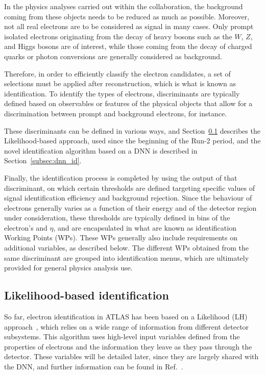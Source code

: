 In the physics analyses carried out within the collaboration, the background coming from these objects needs to be reduced as much as possible. Moreover, not all real electrons are to be considered as signal in many cases. Only prompt isolated electrons originating from the decay of heavy bosons such as the $W$, $Z$, and Higgs bosons are of interest, while those coming from the decay of charged quarks or photon conversions are generally considered as background.

Therefore, in order to efficiently classify the electron candidates, a set of selections must be applied after reconstruction, which is what is known as identification. To identify the types of electrons, discriminants are typically defined based on observables or features of the physical objects that allow for a discrimination between prompt and background electrons, for instance.

These discriminants can be defined in various ways, and Section~\ref{LH_identification} describes the Likelihood-based approach, used since the beginning of the Run-2 period, and the novel identification algorithm based on a DNN is described in Section~\ref{subsec:dnn_id}.

Finally, the identification process is completed by using the output of that discriminant, on which certain thresholds are defined targeting specific values of signal identification efficiency and background rejection. Since the behaviour of electrons generally varies as a function of their energy and of the detector region under consideration, these thresholds are typically defined in bins of the electron’s \et and $\eta$, and are encapsulated in what are known as identification Working Points (WPs). These WPs generally also include requirements on additional variables, as described below. The different WPs obtained from the same discriminant are grouped into identification menus, which are ultimately provided for general physics analysis use.

\subsection{Likelihood-based identification}
\label{LH_identification}
So far, electron identification in ATLAS has been based on a Likelihood (LH) approach~\cite{Aad:2684552,Aaboud:2657964}, which relies on a wide range of information from different detector subsystems. This algorithm uses high-level input variables defined from the properties of electrons and the information they leave as they pass through the detector. These variables will be detailed later, since they are largely shared with the DNN, and further information can be found in Ref.~\cite{Aaboud:2657964}.


